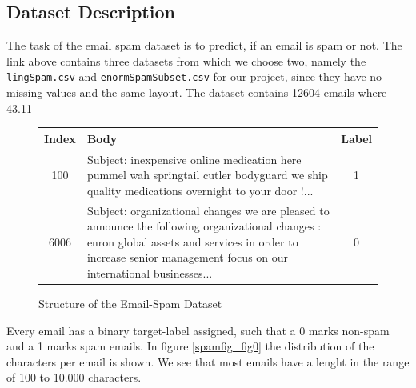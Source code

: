 \documentclass[11pt]{article}
\begin{document}
\subsection{Dataset Description}
The task of the email spam dataset is to predict, if an email is spam or not. The link above contains three datasets from which we choose two, namely the \texttt{lingSpam.csv} and \texttt{enormSpamSubset.csv} for our project, since they have no missing values and the same layout. The dataset contains 12604 emails where 43.11%

\begin{figure}[h]
  \begin{tabular}{ | c | p{15cm} | c |}
    \hline
    Index & Body & Label \\
    \hline
    100 & 
    Subject: inexpensive online medication here
 pummel wah springtail cutler bodyguard
 we ship quality medications overnight to your door !...
    & 1 \\ \hline
    6006
    &
    Subject: organizational changes
 we are pleased to announce the following organizational changes :
 enron global assets and services
 in order to increase senior management focus on our international businesses... 
    & 0 \\
    \hline
    \end{tabular}
    \caption{Structure of the Email-Spam Dataset}
    \label{tab_spam0}
  \end{figure}
Every email has a binary target-label assigned, such that a 0 marks non-spam and a 1 marks spam emails. In figure \ref{spamfig_fig0} the distribution of the characters per email is shown. We see that most emails have a lenght in the range of 100 to 10.000 characters.
\end{document}
